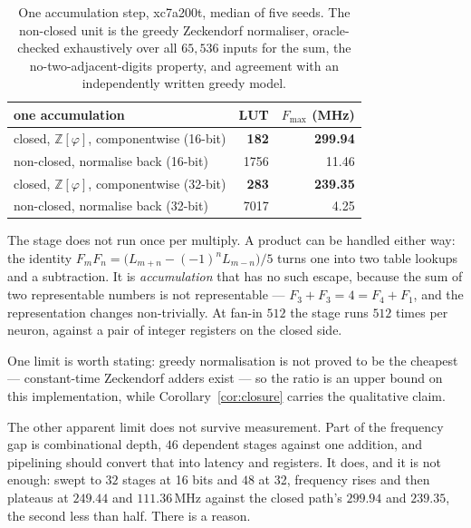 \begin{table}[t]\centering
\caption{One accumulation step, xc7a200t, median of five seeds. The non-closed
unit is the greedy Zeckendorf normaliser, oracle-checked exhaustively over all
$65{,}536$ inputs for the sum, the no-two-adjacent-digits property, and
agreement with an independently written greedy model.}
\label{tab:closure}
\begin{tabular}{lrr}
\toprule
one accumulation & LUT & $F_{\max}$ (MHz) \\
\midrule
closed, $\mathbb{Z}[\varphi]$, componentwise (16-bit) & \textbf{182} & \textbf{299.94} \\
non-closed, normalise back (16-bit)                   & 1756 & 11.46 \\
\addlinespace
closed, $\mathbb{Z}[\varphi]$, componentwise (32-bit) & \textbf{283} & \textbf{239.35} \\
non-closed, normalise back (32-bit)                   & 7017 & 4.25 \\
\bottomrule
\end{tabular}
\end{table}

The stage does not run once per multiply. A product can be handled either way:
the identity $F_mF_n = \bigl(L_{m+n}-(-1)^nL_{m-n}\bigr)/5$ turns one into two
table lookups and a subtraction. It is \emph{accumulation} that has no such
escape, because the sum of two representable numbers is not representable ---
$F_3+F_3 = 4 = F_4+F_1$, and the representation changes non-trivially. At fan-in
$512$ the stage runs $512$ times per neuron, against a pair of integer registers
on the closed side.

One limit is worth stating: greedy normalisation is not proved to be the
cheapest --- constant-time Zeckendorf adders exist --- so the ratio is an upper
bound on this implementation, while Corollary~\ref{cor:closure} carries the
qualitative claim.

The other apparent limit does not survive measurement. Part of the frequency gap
is combinational depth, $46$ dependent stages against one addition, and
pipelining should convert that into latency and registers. It does, and it is
not enough: swept to $32$ stages at 16 bits and $48$ at 32, frequency rises and
then plateaus at $249.44$ and $111.36$\,MHz against the closed path's $299.94$
and $239.35$, the second less than half. There is a reason.

